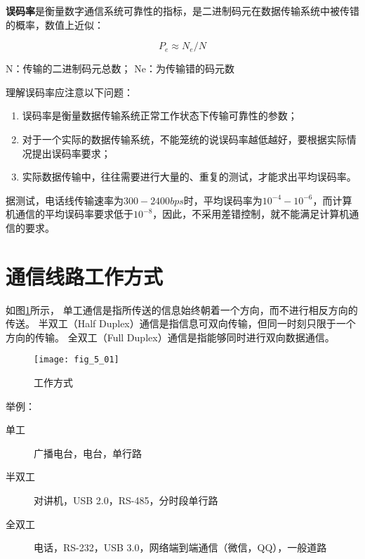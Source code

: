   \textbf{误码率}是衡量数字通信系统可靠性的指标，是二进制码元在数据传输系统中被传错的概率，数值上近似：

  \begin{equation}
    P_e\approx N_e/N
  \end{equation}

N：传输的二进制码元总数；
Ne：为传输错的码元数

   \begin{remark}
     理解误码率应注意以下问题：
     \begin{enumerate}
       \item 误码率是衡量数据传输系统正常工作状态下传输可靠性的参数；
       \item 对于一个实际的数据传输系统，不能笼统的说误码率越低越好，要根据实际情况提出误码率要求；
       \item 实际数据传输中，往往需要进行大量的、重复的测试，才能求出平均误码率。
     \end{enumerate}


         据测试，电话线传输速率为$300-2400bps$时，平均误码率为$10^{-4} - 10^{-6}$，而计算机通信的平均误码率要求低于$10^{-8}$，因此，不采用差错控制，就不能满足计算机通信的要求。

   \end{remark}


\section{通信线路工作方式}


如图\ref{fig_5_01}所示，
  单工通信是指所传送的信息始终朝着一个方向，而不进行相反方向的传送。
  半双工（Half Duplex）通信是指信息可双向传输，但同一时刻只限于一个方向的传输。
  全双工（Full Duplex）通信是指能够同时进行双向数据通信。




\begin{center}
\begin{figure}
  \centering
  \texttt{[image: fig\_5\_01]}\\
  \caption{工作方式}\label{fig_5_01}
\end{figure}
\end{center}

\begin{remark}
举例：

  \begin{description}
       \item[单工] 广播电台，电台，单行路
       \item[半双工] 对讲机，USB 2.0，RS-485，分时段单行路
       \item[全双工] 电话，RS-232，USB 3.0，网络端到端通信（微信，QQ），一般道路
     \end{description}


\end{remark}

